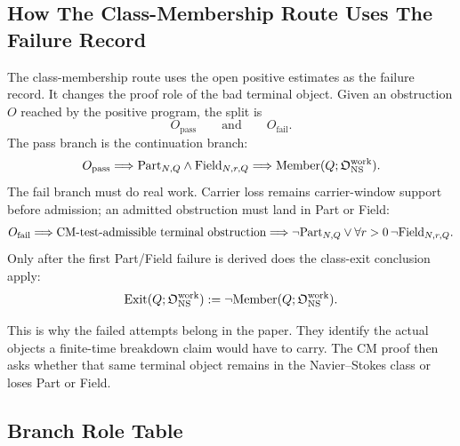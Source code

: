 \subsection{How The Class-Membership Route Uses The Failure Record}

The class-membership route uses the open positive estimates as the failure
record.
It changes the proof role of the bad terminal object.
Given an obstruction \(O\) reached by the positive program, the split is
\[
  O_{\mathrm{pass}}
  \qquad\text{and}\qquad
  O_{\mathrm{fail}}.
\]
The pass branch is the continuation branch:
\[
  O_{\mathrm{pass}}
  \Longrightarrow
  \mathrm{Part}_{N,Q}\wedge\mathrm{Field}_{N,r,Q}
  \Longrightarrow
  \mathrm{Member}(Q;\mathfrak O_{\mathrm{NS}}^{\mathrm{work}}).
\]
The fail branch must do real work.  Carrier loss remains carrier-window support
before admission; an admitted obstruction must land in Part or Field:
\[
  O_{\mathrm{fail}}
  \Longrightarrow
  \text{CM-test-admissible terminal obstruction}
  \Longrightarrow
  \neg\mathrm{Part}_{N,Q}
  \vee
  \forall r>0\,\neg\mathrm{Field}_{N,r,Q}.
\]
Only after the first Part/Field failure is derived does the class-exit conclusion
apply:
\[
  \mathrm{Exit}(Q;\mathfrak O_{\mathrm{NS}}^{\mathrm{work}}):=\neg\mathrm{Member}(Q;\mathfrak O_{\mathrm{NS}}^{\mathrm{work}}).
\]

This is why the failed attempts belong in the paper.
They identify the actual objects a finite-time breakdown claim would have to
carry.
The CM proof then asks whether that same terminal object remains in the
Navier--Stokes class or loses Part or Field.

\subsection{Branch Role Table}

